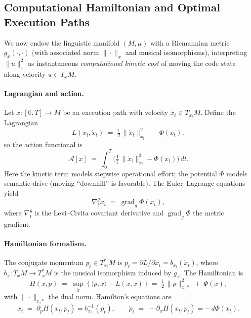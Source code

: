 \documentclass[12pt,a4paper]{article}
\theoremstyle{plain}
\theoremstyle{definition}
\theoremstyle{remark}
\newcommand{\Phifield}{\Phi}
\begin{document}
\subsection{Computational Hamiltonian and Optimal Execution Paths}
\label{subsec:hamiltonian}

We now endow the linguistic manifold $(M,\mu)$ with a Riemannian metric $g_x(\cdot,\cdot)$ (with associated norm $\|\cdot\|_x$ and musical isomorphisms), interpreting $\|u\|_x^2$ as instantaneous \emph{computational kinetic cost} of moving the code state along velocity $u\in T_xM$.

\paragraph{Lagrangian and action.}
Let $x:[0,T]\!\to\! M$ be an execution path with velocity $\dot x_t\in T_{x_t}M$. Define the Lagrangian
\begin{equation}\label{eq:lagrangian}
L(x_t,\dot x_t)\;=\;\tfrac{1}{2}\,\|\dot x_t\|_{x_t}^2 \;-\; \Phifield(x_t),
\end{equation}
so the action functional is
\begin{equation}\label{eq:action}
\mathcal{A}[x]\;=\;\int_{0}^{T}\!\Big(\tfrac{1}{2}\,\|\dot x_t\|_{x_t}^2-\Phifield(x_t)\Big)\,dt.
\end{equation}
Here the kinetic term models stepwise operational effort; the potential $\Phifield$ models semantic drive (moving ``downhill'' is favorable). The Euler--Lagrange equations yield
\begin{equation}\label{eq:euler-lagrange}
\nabla^{g}_{t}\dot x_t \;=\; \operatorname{grad}_{g}\Phifield(x_t),
\end{equation}
where $\nabla^{g}_{t}$ is the Levi–Civita covariant derivative and $\operatorname{grad}_{g}\Phifield$ the metric gradient.

\paragraph{Hamiltonian formalism.}
The conjugate momentum $p_t\in T^*_{x_t}M$ is $p_t=\partial L/\partial \dot x_t=b_{x_t}(\dot x_t)$, where $b_{x}:T_xM\!\to\!T_x^*M$ is the musical isomorphism induced by $g_x$. The Hamiltonian is
\begin{equation}\label{eq:hamiltonian}
H(x,p)\;=\;\sup_{\dot x}\,\big\{\,\langle p,\dot x\rangle - L(x,\dot x)\,\big\} \;=\;\tfrac{1}{2}\,\|p\|_{x,*}^{2}\;+\;\Phifield(x),
\end{equation}
with $\|\cdot\|_{x,*}$ the dual norm. Hamilton’s equations are
\begin{equation}\label{eq:hamilton-eq}
\dot x_t \;=\; \partial_{p}H(x_t,p_t)= b_{x_t}^{-1}(p_t), \qquad \dot p_t \;=\; -\partial_{x}H(x_t,p_t)= -\,d\Phifield(x_t).
\end{equation}
\end{document}
